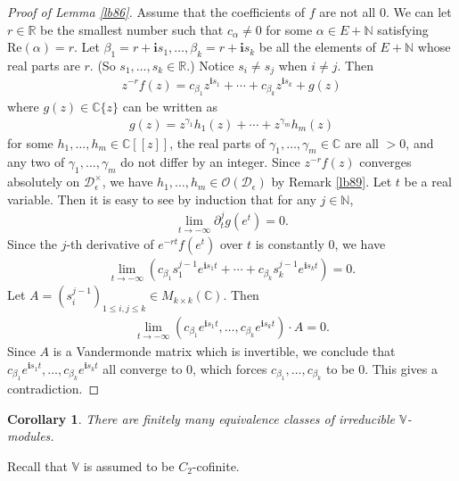 \documentclass[12pt,a4paper,notitlepage]{report}
\theoremstyle{definition}
\theoremstyle{plain}
\newtheorem{co}[df]{Corollary}
\newcommand{\mc}{\mathcal}
\newcommand{\scr}{\mathscr}
\newcommand{\im}{\mathbf{i}}
\newcommand{\Vbb}{\mathbb V}
\newcommand{\Cbb}{\mathbb C}
\newcommand{\Nbb}{\mathbb N}
\newcommand{\Rbb}{\mathbb R}
\numberwithin{equation}{section}
\begin{document}
\begin{proof}[Proof of Lemma \ref{lb86}]
Assume that the coefficients of $f$ are not all $0$. We can let $r\in\Rbb$ be the smallest number such that $c_\alpha\neq 0$ for some $\alpha\in E+\Nbb$ satisfying $\mathrm{Re}(\alpha)=r$. Let $\beta_1=r+\im s_1,\dots,\beta_k=r+\im s_k$ be all the elements of $E+\Nbb$ whose real parts are $r$. (So $s_1,\dots,s_k\in\Rbb$.) Notice $s_i\neq s_j$ when $i\neq j$. Then 
\begin{align*}
z^{-r}f(z)=c_{\beta_1}z^{\im s_1}+\cdots +c_{\beta_k}z^{\im s_k}+g(z)
\end{align*}
where $g(z)\in\Cbb\{z\}$ can be written as
\begin{align*}
g(z)=z^{\gamma_1}h_1(z)+\cdots+z^{\gamma_m}h_m(z)
\end{align*}
for some $h_1,\dots,h_m\in\Cbb[[z]]$,  the real parts of $\gamma_1,\dots,\gamma_m\in\Cbb$ are all $>0$, and any two of $\gamma_1,\dots,\gamma_m$ do not differ by an integer. Since $z^{-r}f(z)$ converges absolutely on $\mc D_\epsilon^\times$, we have $h_1,\dots,h_m\in\scr O(\mc D_\epsilon)$ by Remark \ref{lb89}. Let $t$ be a real variable.  Then it is easy to see by induction  that for any $j\in\Nbb$,
\begin{align*}
\lim_{t\rightarrow-\infty}\partial_t^jg(e^t)=0.
\end{align*}
Since the $j$-th derivative of $e^{-rt}f(e^t)$ over $t$ is constantly $0$, we have
\begin{align*}
\lim_{t\rightarrow-\infty}(c_{\beta_1}s_1^{j-1}e^{\im s_1 t}+\cdots +c_{\beta_k}s_k^{j-1}e^{\im s_k t})=0.
\end{align*}
Let $A=(s_i^{j-1})_{1\leq i,j\leq k}\in M_{k\times k}(\Cbb)$.  Then
\begin{align*}
\lim_{t\rightarrow-\infty} (c_{\beta_1} e^{\im s_1t},\dots,c_{\beta_k} e^{\im s_k t})\cdot A=0.
\end{align*} 
Since $A$ is a Vandermonde matrix which is invertible, we conclude that $c_{\beta_1} e^{\im s_1t},\dots,c_{\beta_k} e^{\im s_k t}$ all converge to $0$, which forces $c_{\beta_1},\dots,c_{\beta_k}$ to be $0$. This gives a contradiction.
\end{proof}



\begin{co}\label{lb118}
There are finitely many equivalence classes of irreducible $\Vbb$-modules.
\end{co}

Recall that $\Vbb$ is assumed to be $C_2$-cofinite.
\end{document}
